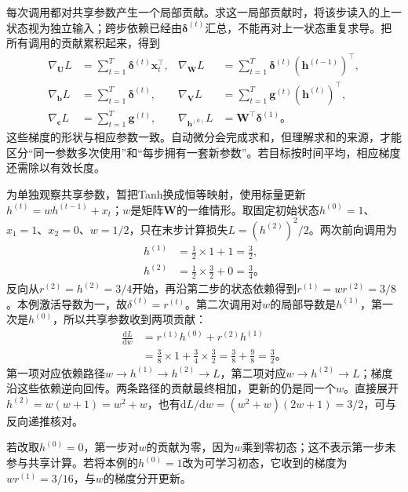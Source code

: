 每次调用都对共享参数产生一个局部贡献。求这一局部贡献时，将该步读入的上一状态视为独立输入；跨步依赖已经由$\bm{\delta}^{(t)}$汇总，不能再对上一状态重复求导。把所有调用的贡献累积起来，得到
\begin{equation}
  \begin{aligned}
    \nabla_{\bm{U}}L&=\sum_{t=1}^{T}\bm{\delta}^{(t)}\bm{x}_t^{\top},
    &\nabla_{\bm{W}}L&=\sum_{t=1}^{T}\bm{\delta}^{(t)}
      (\bm{h}^{(t-1)})^{\top},\\
    \nabla_{\bm{b}}L&=\sum_{t=1}^{T}\bm{\delta}^{(t)},
    &\nabla_{\bm{V}}L&=\sum_{t=1}^{T}\bm{g}^{(t)}(\bm{h}^{(t)})^{\top},\\
    \nabla_{\bm{c}}L&=\sum_{t=1}^{T}\bm{g}^{(t)},
    &\nabla_{\bm{h}^{(0)}}L&=\bm{W}^{\top}\bm{\delta}^{(1)}\text{。}
  \end{aligned}
  \label{eq:rnn-shared-gradients}
\end{equation}
这些梯度的形状与相应参数一致。自动微分会完成求和，但理解求和的来源，才能区分“同一参数多次使用”和“每步拥有一套新参数”。若目标按时间平均，相应梯度还需除以有效长度。

\begin{example}[两步递推中的梯度累积]
  \label{ex:rnn-shared-gradient}
  为单独观察共享参数，暂把Tanh换成恒等映射，使用标量更新$h^{(t)}=w h^{(t-1)}+x_t$；$w$是矩阵$\bm W$的一维情形。取固定初始状态$h^{(0)}=1$、$x_1=1$、$x_2=0$、$w=1/2$，只在末步计算损失$L=(h^{(2)})^2/2$。两次前向调用为
  \[
    \begin{aligned}
      h^{(1)}&=\tfrac12\times1+1=\tfrac32,\\
      h^{(2)}&=\tfrac12\times\tfrac32+0=\tfrac34\text{。}
    \end{aligned}
  \]
  反向从$r^{(2)}=h^{(2)}=3/4$开始，再沿第二步的状态依赖得到$r^{(1)}=w r^{(2)}=3/8$。本例激活导数为一，故$\delta^{(t)}=r^{(t)}$。第二次调用对$w$的局部导数是$h^{(1)}$，第一次是$h^{(0)}$，所以共享参数收到两项贡献：
  \[
    \begin{aligned}
      \frac{\mathrm dL}{\mathrm dw}
        &=r^{(1)}h^{(0)}+r^{(2)}h^{(1)}\\
        &=\tfrac38\times1+\tfrac34\times\tfrac32
          =\tfrac38+\tfrac98=\tfrac32\text{。}
    \end{aligned}
  \]
  第一项对应依赖路径$w\to h^{(1)}\to h^{(2)}\to L$，第二项对应$w\to h^{(2)}\to L$；梯度沿这些依赖逆向回传。两条路径的贡献最终相加，更新的仍是同一个$w$。直接展开$h^{(2)}=w(w+1)=w^2+w$，也有$\mathrm dL/\mathrm dw=(w^2+w)(2w+1)=3/2$，可与反向递推核对。

  若改取$h^{(0)}=0$，第一步对$w$的贡献为零，因为$w$乘到零初态；这不表示第一步未参与共享计算。若将本例的$h^{(0)}=1$改为可学习初态，它收到的梯度为$w r^{(1)}=3/16$，与$w$的梯度分开更新。
\end{example}

